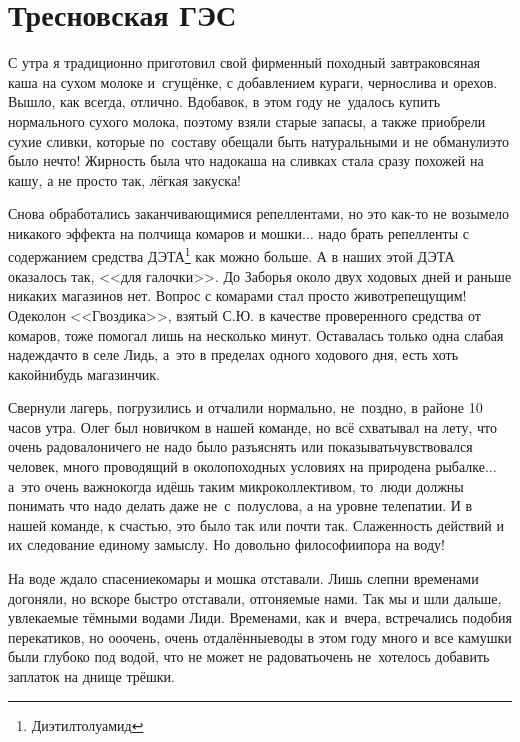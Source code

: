\chapter{Тресновская ГЭС} 
\vepsianrose

С утра я традиционно приготовил свой фирменный походный завтрак\mdash овсяная каша на сухом молоке и~сгущёнке, с добавлением кураги, чернослива и орехов. Вышло, как всегда, отлично. Вдобавок, в этом году не~удалось купить нормального сухого молока, поэтому взяли старые запасы, а также приобрели сухие сливки, которые по~составу обещали быть натуральными и не обманули\mdash это было нечто! Жирность была что надо\mdash каша на сливках стала сразу похожей на кашу, а не просто так, лёгкая закуска! 

Снова обработались заканчивающимися репеллентами, но это как-то не возымело никакого эффекта на полчища комаров и мошки$\ldots$ надо брать репелленты с содержанием средства ДЭТА\footnote[1]{Диэтилтолуамид} как можно больше. А в наших этой ДЭТА оказалось так, <<для галочки>>. До Заборья около двух ходовых дней и раньше никаких магазинов нет. Вопрос с комарами стал просто животрепещущим! Одеколон <<Гвоздика>>, взятый С.Ю. в качестве проверенного средства от комаров, тоже помогал лишь на несколько минут. Оставалась только одна слабая надежда\mdash что в селе Лидь, а~это в пределах одного ходового дня, есть хоть какой\sdash нибудь магазинчик.

Свернули лагерь, погрузились и отчалили нормально, не~поздно, в районе 10 часов утра. Олег был новичком в нашей команде, но всё схватывал на лету, что очень радовало\mdash ничего не надо было разъяснять или показывать\mdash чувствовался человек, много проводящий в околопоходных условиях на природе\mdash на рыбалке$\ldots$ а~это очень важно\mdash когда идёшь таким микроколлективом, то~люди должны понимать что надо делать даже не~с~полуслова, а на уровне телепатии. И в нашей команде, к счастью, это было так или почти так. Слаженность действий и их следование единому замыслу. Но довольно философии\mdash пора на воду!

На воде ждало спасение\mdash комары и мошка отставали. Лишь слепни временами догоняли, но вскоре быстро отставали, отгоняемые нами. Так мы и шли дальше, увлекаемые тёмными водами Лиди. Временами, как и~вчера, встречались подобия перекатиков, но о\sdash о\sdash очень, очень отдалённые\mdash воды в этом году много и все камушки были глубоко под водой, что не может не радовать\mdash очень не~хотелось добавить заплаток на днище трёшки. 

